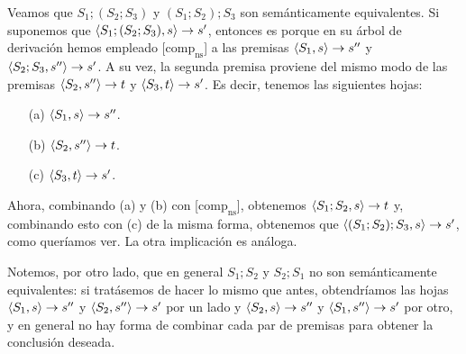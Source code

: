 \begin{example}
Veamos que $S_1; (S_2; S_3)$ y $(S_1; S_2); S_3$ son semánticamente equivalentes. Si suponemos que $\langle S_1; (S_2; S_3), s \rangle\rightarrow s'$, entonces es porque en su árbol de derivación hemos empleado [$\text{comp}_{\text{ns}}$] a las premisas $\langle S_1, s \rangle\rightarrow s''$ y $\langle S_2;S_3, s'' \rangle\rightarrow s'$. A su vez, la segunda premisa proviene del mismo modo de las premisas $\langle S_2, s'' \rangle\rightarrow t$ y $\langle S_3, t \rangle\rightarrow s'$. Es decir, tenemos las siguientes hojas:
\begin{itemize}
    \item[(a)] $\langle S_1, s \rangle\rightarrow s''$.
    \item[(b)] $\langle S_2, s'' \rangle\rightarrow t$.
    \item[(c)] $\langle S_3, t \rangle\rightarrow s'$.
\end{itemize}
Ahora, combinando (a) y (b) con [$\text{comp}_{\text{ns}}$], obtenemos $\langle S_1;S_2, s \rangle\rightarrow t$ y, combinando esto con (c) de la misma forma, obtenemos que $\langle (S_1; S_2);S_3, s \rangle\rightarrow s'$, como queríamos ver. La otra implicación es análoga.

Notemos, por otro lado, que en general $S_1;S_2$ y $S_2; S_1$ no son semánticamente equivalentes: si tratásemos de hacer lo mismo que antes, obtendríamos las hojas $\langle S_1, s \rangle\rightarrow s''$ y $\langle S_2, s'' \rangle\rightarrow s'$ por un lado y $\langle S_2, s \rangle\rightarrow s''$ y $\langle S_1, s'' \rangle\rightarrow s'$ por otro, y en general no hay forma de combinar cada par de premisas para obtener la conclusión deseada.
\end{example}
\\


